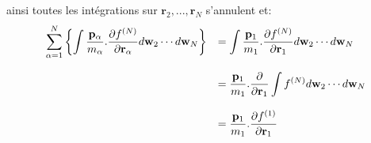 ainsi toutes les intégrations sur $\mathbf{r}_{2},...,\mathbf{r}_{N}$ s'annulent et:
\begin{align*}%
	\begin{array}[c]{ll}%
		\displaystyle\sum\limits_{\alpha=1}^{N}\left\{  \displaystyle\int%
		\dfrac{\mathbf{p}_{\alpha}}{m_{\alpha}}.\dfrac{\partial f^{(N)}}%
		{\partial\mathbf{r}_{\alpha}}d\mathbf{w}_{2}\cdots d\mathbf{w}_{N}\right\}  &
		=\displaystyle\int\dfrac{\mathbf{p}_{1}}{m_{1}}.\dfrac{\partial f^{(N)}%
		}{\partial\mathbf{r}_{1}}d\mathbf{w}_{2}\cdots d\mathbf{w}_{N}\\
		& \\
		& =\dfrac{\mathbf{p}_{1}}{m_{1}}.\dfrac{\partial}{\partial\mathbf{r}_{1}%
		}\displaystyle\int f^{(N)}d\mathbf{w}_{2}\cdots d\mathbf{w}_{N}\\
		& \\
		& =\dfrac{\mathbf{p}_{1}}{m_{1}}.\dfrac{\partial f^{(1)}}{\partial
		\mathbf{r}_{1}}%
	\end{array}
\end{align*}

